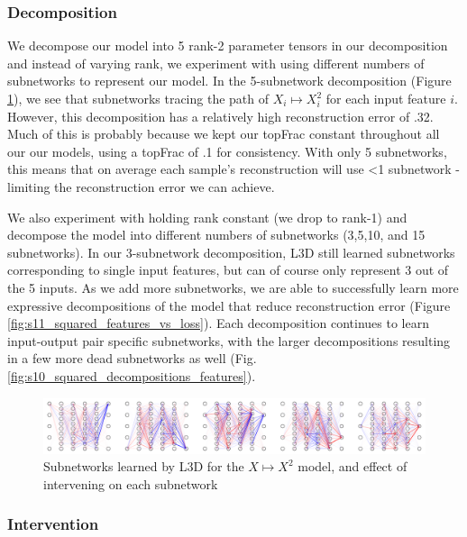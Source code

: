 \documentclass{article}
\theoremstyle{plain}
\theoremstyle{definition}
\theoremstyle{remark}
\begin{document}
\subsubsection{Decomposition}

We decompose our model into 5 rank-2 parameter tensors in our decomposition and instead of varying rank, we experiment with using different numbers of subnetworks to represent our model. In the 5-subnetwork decomposition (Figure \ref{fig:8_squared_subnetworks}), we see that subnetworks tracing the path of $X_i \mapsto X_i^2$ for each input feature $i$. However, this decomposition has a relatively high reconstruction error of .32. Much of this is probably because we kept our topFrac constant throughout all our our models, using a topFrac of .1 for consistency.  With only 5 subnetworks, this means that on average each sample's reconstruction will use <1 subnetwork - limiting the reconstruction error we can achieve. 

We also experiment with holding rank constant (we drop to rank-1) and decompose the model into different numbers of subnetworks (3,5,10, and 15 subnetworks). In our 3-subnetwork decomposition, L3D still learned subnetworks corresponding to single input features, but can of course only represent 3 out of the 5 inputs. As we add more subnetworks, we are able to successfully learn more expressive decompositions of the model that reduce reconstruction error (Figure \ref{fig:s11_squared_features_vs_loss}). Each decomposition continues to learn input-output pair specific subnetworks, with the larger decompositions resulting in a few more dead subnetworks as well (Fig. \ref{fig:s10_squared_decompositions_features}).

\begin{figure}[htbp]
    \centerline{\includegraphics[width=\textwidth]{../figures/8_squared_subnetworks.pdf}}
    \centering
    \caption{Subnetworks learned by L3D for the $X \mapsto X^2$ model, and effect of intervening on each subnetwork}\label{fig:8_squared_subnetworks}
\end{figure}



\subsubsection{Intervention}
\end{document}

